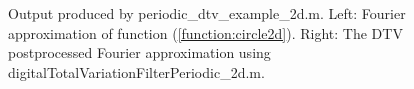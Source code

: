 \documentclass[12pt]{article}
\begin{document}
\begin{figure}[tbh]
   \centering
 \caption{Output produced by periodic\_dtv\_example\_2d.m. Left: Fourier approximation of function (\ref{function:circle2d}).  Right: The DTV postprocessed Fourier approximation using digitalTotalVariationFilterPeriodic\_2d.m.
          } \label{fig:dtvExample2d}
 \end{figure}
 
\end{document}
